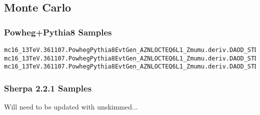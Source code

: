 \subsection{Monte Carlo}

\subsubsection{Powheg+Pythia8 Samples}

\begin{tiny}
\begin{verbatim}
mc16_13TeV.361107.PowhegPythia8EvtGen_AZNLOCTEQ6L1_Zmumu.deriv.DAOD_STDM7.e3601_s3126_r9364_p4145
mc16_13TeV.361107.PowhegPythia8EvtGen_AZNLOCTEQ6L1_Zmumu.deriv.DAOD_STDM7.e3601_s3126_r10201_p4145
mc16_13TeV.361107.PowhegPythia8EvtGen_AZNLOCTEQ6L1_Zmumu.deriv.DAOD_STDM7.e3601_s3126_r10724_p4145
\end{verbatim}
\end{tiny}

\subsubsection{Sherpa 2.2.1 Samples}
Will need to be updated with unskimmed...

